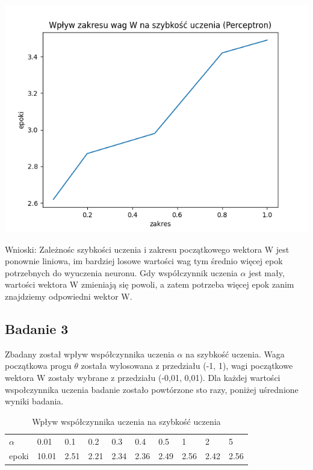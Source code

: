 \documentclass{article}
\begin{document}
\begin{center}
\includegraphics[scale=0.8]{per_exp2.png}
\end{center}

Wnioski: Zależnośc szybkości uczenia i zakresu początkowego wektora W jest ponownie liniowa, im bardziej losowe wartości wag tym średnio więcej epok potrzebnych do wyuczenia neuronu. Gdy współczynnik uczenia $\alpha$ jest mały, wartości wektora W zmieniają się powoli, a zatem potrzeba więcej epok zanim znajdziemy odpowiedni wektor W. \\

\newpage
\subsection{Badanie 3}

Zbadany został wpływ współczynnika uczenia $\alpha$ na szybkość uczenia. Waga początkowa progu $\theta$ została wylosowana z przedziału (-1, 1), wagi początkowe wektora W zostały wybrane z przedziału (-0,01, 0,01). Dla każdej wartości wspołczynnika uczenia badanie zostało powtórzone sto razy, poniżej uśrednione wyniki badania.\\


\begin{table}[h]
  \centering
  \caption{Wpływ współczynnika uczenia na szybkość uczenia}
  \begin{tabular}{llllllllll}
    \toprule
    $\alpha$ & 0.01 & 0.1 & 0.2 & 0.3 & 0.4 & 0.5 & 1 & 2 & 5 \\
    epoki & 10.01 & 2.51 & 2.21 & 2.34 & 2.36 & 2.49 & 2.56 & 2.42 & 2.56 \\
    \bottomrule
  \end{tabular}
\end{table}
\end{document}
